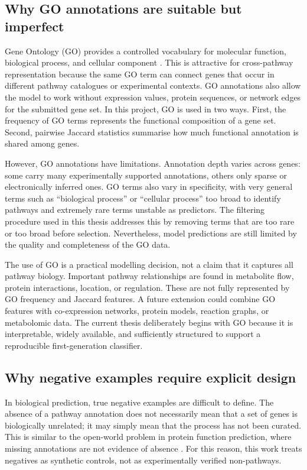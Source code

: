 \documentclass[12pt,twoside]{article}
\begin{document}
\subsection{Why GO annotations are suitable but imperfect}
\label{sec:bg_go_suitable_imperfect}

Gene Ontology (GO) provides a controlled vocabulary for molecular function, biological process, and cellular component \citep{ashburner2000gene,geneontology2023}. This is attractive for cross-pathway representation because the same GO term can connect genes that occur in different pathway catalogues or experimental contexts. GO annotations also allow the model to work without expression values, protein sequences, or network edges for the submitted gene set. In this project, GO is used in two ways. First, the frequency of GO terms represents the functional composition of a gene set. Second, pairwise Jaccard statistics summarise how much functional annotation is shared among genes.

However, GO annotations have limitations. Annotation depth varies across genes: some carry many experimentally supported annotations, others only sparse or electronically inferred ones. GO terms also vary in specificity, with very general terms such as ``biological process'' or ``cellular process'' too broad to identify pathways and extremely rare terms unstable as predictors. The filtering procedure used in this thesis addresses this by removing terms that are too rare or too broad before selection. Nevertheless, model predictions are still limited by the quality and completeness of the GO data.

The use of GO is a practical modelling decision, not a claim that it captures all pathway biology. Important pathway relationships are found in metabolite flow, protein interactions, location, or regulation. These are not fully represented by GO frequency and Jaccard features. A future extension could combine GO features with co-expression networks, protein models, reaction graphs, or metabolomic data. The current thesis deliberately begins with GO because it is interpretable, widely available, and sufficiently structured to support a reproducible first-generation classifier.

\subsection{Why negative examples require explicit design}
\label{sec:bg_negative_design}

In biological prediction, true negative examples are difficult to define. The absence of a pathway annotation does not necessarily mean that a set of genes is biologically unrelated; it may simply mean that the process has not been curated. This is similar to the open-world problem in protein function prediction, where missing annotations are not evidence of absence \citep{radivojac2013community}. For this reason, this work treats negatives as synthetic controls, not as experimentally verified non-pathways.
\end{document}
